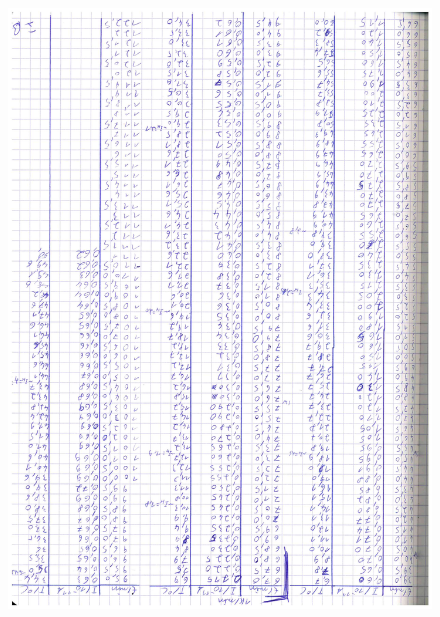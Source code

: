 \begin{figure}[htb]
  \centering
  \includegraphics[height=\textheight]{data/Messdaten2.pdf}
\end{figure}
